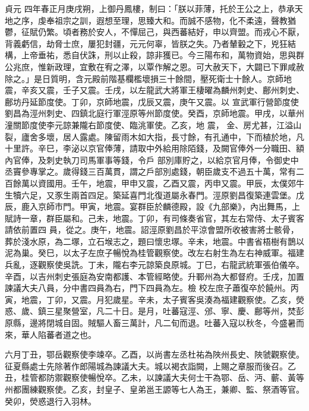 
\begin{pinyinscope}

 貞元
 四年春正月庚戌朔，上御丹鳳樓，制曰：「朕以菲薄，托於王公之上，恭承天地之序，虔奉祖宗之訓，遐想至理，思臻大和。而誠不感物，化不柔遠，聲教猶鬱，征賦仍繁。頃者務於安人，不憚屈己，與西蕃結好，申以齊盟。而戎心不厭，背義虧信，劫脅士庶，屢犯封疆，元元何辜，皆朕之失。乃者輦轂之下，兇狂結構，上帝垂祐，悉自伏誅，刑以止殺，諒非獲已。今三陽布和，萬物資始，思與群公兆庶，惟新政理，宜敷在宥之澤，以覃作解之恩。可大赦天下，大闢已下罪咸赦除之。」是日質明，含元殿前階基欄檻壞損三十餘間，壓死衛士十餘人。京師地震，辛亥又震，壬子又震。壬戌，以左龍武大將軍王棲曜為麟州刺史、鄜州刺史、鄜坊丹延節度使。丁卯，京師地震，戊辰又震，庚午又震。以
 宣武軍行營節度使劉昌為涇州刺史、四鎮北庭行軍涇原等州節度使。癸酉，京師地震。甲戌，以華州潼關節度使李元諒兼隴右節度使、臨洮軍使。乙亥，地
 震，
 金、房尤甚，江溢山裂，廬舍多壞，居人露處。陳留雨木如大指，長寸餘，有孔通中，下而植於地，凡十里許。辛巳，李泌以京官俸薄，請取中外給用除陌錢，及闕官俸外一分職田、額內官俸，及刺史執刀司馬軍事等錢，令戶
 部別庫貯之，以給京官月俸，令御史中丞竇參專掌之。歲得錢三百萬貫，謂之戶部別處錢，朝臣歲支不過五十萬，常有二百餘萬以資國用。壬午，地震，甲申又震，乙酉又震，丙申又震。甲辰，太僕郊牛生犢六足，又豕生兩首四足。築延喜門北復道屬永春門。涇原劉昌復築連雲堡。戊辰，鹿入京師市門。甲寅，地震。宴群臣於麟德殿，設《九部樂》，內出舞馬，上賦詩一章，群臣屬和。己未，地震。丁卯，有司條奏省官，其左右常侍、太子賓客請依前置四
 員，從之。庚午，地震。詔涇原劉昌於平涼會盟所收被害將士骸骨，葬於淺水原，為二塚，立石堠志之，題曰懷忠塚。辛未，地震。中書省梧樹有鵲以泥為巢。癸巳，以太子左庶子暢悅為桂管觀察使。改左右射生為左右神威軍。福建兵亂，逐觀察使吳詵。丁未，隴右李元諒築良原城。丁巳，右龍武統軍張伯儀卒。辛酉，以吉州刺史張庭為安南都護、本管經略使。升鄆州為大都督府。壬戌，加置諫議大夫八員，分中書四員為右，門下四員為左。檢
 校左庶子蕭復卒於饒州。丙寅，地震，丁卯，又震。月犯歲星。辛未，太子賓客吳湊為福建觀察使。乙亥，熒惑、歲、鎮三星聚營室，凡二十日。是月，吐蕃寇涇、邠、寧、慶、鄜等州，焚彭原縣，邊將閉城自固。賊驅人畜三萬計，凡二旬而退。吐蕃入寇以秋冬，今盛暑而來，華人陷蕃者道之也。



 六月丁丑，鄂岳觀察使李竦卒。乙酉，以尚書左丞杜祐為陜州長史、陜虢觀察使。征夏縣處士先除著作郎陽城為諫議大夫。城以褐衣詣闕，上賜之章服而後召。乙
 丑，桂管都防禦觀察使暢悅卒。乙未，以諫議大夫何士干為鄂、岳、沔、蘄、黃等州都團練觀察使。乙亥，封皇子、皇弟邕王謜等七人為王，兼卿、監、祭酒等官。癸卯，熒惑退行入羽林。




\end{pinyinscope}
